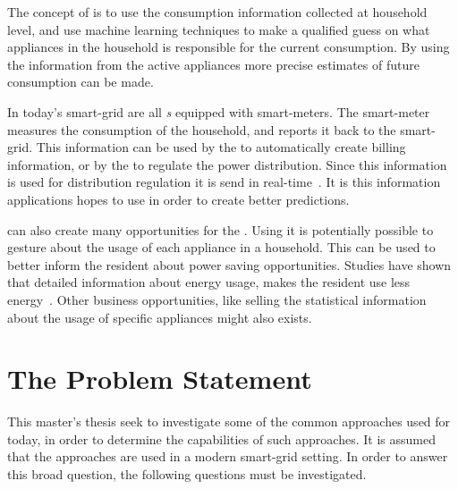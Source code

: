 The concept of  is to use the consumption information collected at household level, and use machine learning techniques to make a qualified guess on what appliances in the household is responsible for the current consumption. By using the information from the active appliances more precise estimates of future consumption can be made. 

In today's smart-grid are all \textit{s} equipped with smart-meters. The smart-meter measures the consumption of the household, and reports it back to the smart-grid. This information can be used by the  to automatically create billing information, or by the  to regulate the power distribution. Since this information is used for distribution regulation it is send in real-time~\citep{RefWorks:41}. It is this information  applications hopes to use in order to create better predictions.

 can also create many opportunities for the . Using  it is potentially possible to gesture about the usage of each appliance in a household. This can be used to better inform the resident about power saving opportunities. Studies have shown that detailed information about energy usage, makes the resident use less energy~\citep{RefWorks:33}. Other business opportunities, like selling the statistical information about the usage of specific appliances might also exists.  

\section{The Problem Statement}

This master's thesis seek to investigate some of the common approaches used for  today, in order to determine the capabilities of such approaches. It is assumed that the  approaches are used in a modern smart-grid setting. In order to answer this broad question, the following questions must be investigated. 

